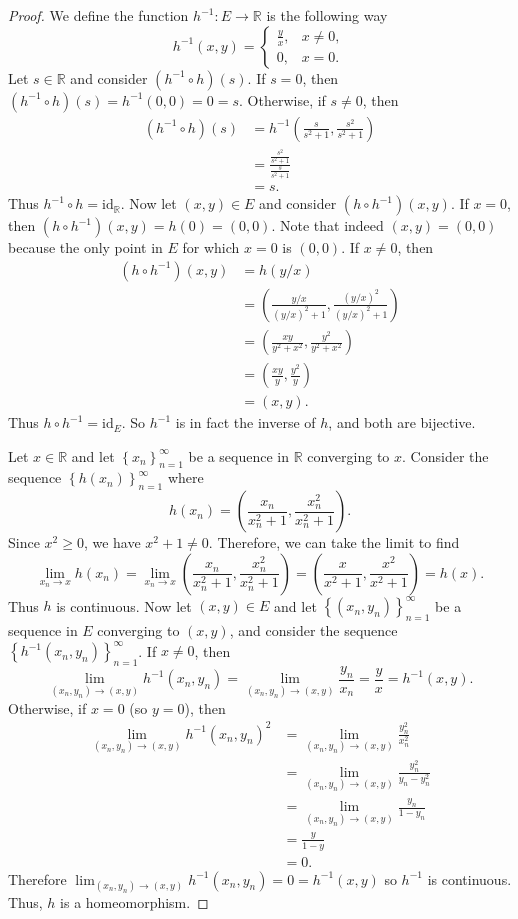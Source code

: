 \documentclass[12pt]{article}
\newcommand{\R}{\mathbb{R}}
\newcommand{\id}{\text{id}}
\newcommand{\ds}{\displaystyle}
\newcommand{\seq}[1]{\left\{#1\right\}_{n=1}^\infty}
\begin{document}
\begin{proof}
    We define the function $h^{-1}:E\to\R$ is the following way
    \[h^{-1}(x,y) = \begin{cases}\frac yx, &x\ne0, \\ 0, & x=0. \end{cases}\]
    Let $s\in\R$ and consider $(h^{-1}\circ h)(s)$. If $s=0$, then $(h^{-1}\circ h)(s) = h^{-1}(0,0) = 0 = s$. Otherwise, if $s\ne0$, then
    \begin{align*}
        (h^{-1}\circ h)(s)
            &= h^{-1}\left(\frac{s}{s^2+1}, \frac{s^2}{s^2+1}\right) \\
            &= \frac{\frac{s^2}{s^2+1}}{\frac{s}{s^2+1}} \\
            &= s.
    \end{align*}
    Thus $h^{-1}\circ h = \id_\R$. Now let $(x,y)\in E$ and consider $(h\circ h^{-1})(x,y)$. If $x=0$, then $(h\circ h^{-1})(x,y) = h(0) = (0,0)$. Note that indeed $(x,y)=(0,0)$ because the only point in $E$ for which $x=0$ is $(0,0)$. If $x\ne0$, then
    \begin{align*}
        (h\circ h^{-1})(x,y)
            &= h(y/x) \\
            &= \left(\frac{y/x}{(y/x)^2+1}, \frac{(y/x)^2}{(y/x)^2+1}\right) \\
            &= \left(\frac{xy}{y^2+x^2}, \frac{y^2}{y^2+x^2}\right) \\
            &= \left(\frac{xy}{y}, \frac{y^2}{y}\right) \\
            &= (x,y).
    \end{align*}
    Thus $h\circ h^{-1} = \id_E$. So $h^{-1}$ is in fact the inverse of $h$, and both are bijective.
    
    Let $x\in\R$ and let $\seq{x_n}$ be a sequence in $\R$ converging to $x$. Consider the sequence $\seq{h(x_n)}$ where
    \[h(x_n) = \left(\frac{x_n}{x_n^2+1}, \frac{x_n^2}{x_n^2+1}\right).\]
    Since $x^2\geq0$, we have $x^2+1\ne0$. Therefore, we can take the limit to find
    \[\lim_{x_n\to x}h(x_n) = \lim_{x_n\to x}\left(\frac{x_n}{x_n^2+1}, \frac{x_n^2}{x_n^2+1}\right) = \left(\frac{x}{x^2+1}, \frac{x^2}{x^2+1}\right) = h(x).\]
    Thus $h$ is continuous. Now let $(x,y)\in E$ and let $\seq{(x_n,y_n)}$ be a sequence in $E$ converging to $(x,y)$, and consider the sequence $\seq{h^{-1}(x_n,y_n)}$. If $x\ne0$, then
    \[\lim_{(x_n,y_n)\to(x,y)}h^{-1}(x_n,y_n) = \lim_{(x_n,y_n)\to(x,y)}\frac{y_n}{x_n} = \frac yx = h^{-1}(x,y).\]
    Otherwise, if $x=0$ (so $y=0$), then
    \begin{align*}
        \lim_{(x_n,y_n)\to(x,y)}h^{-1}(x_n,y_n)^2 
            &= \lim_{(x_n,y_n)\to(x,y)}\frac{y_n^2}{x_n^2} \\
            &= \lim_{(x_n,y_n)\to(x,y)}\frac{y_n^2}{y_n-y_n^2} \\
            &= \lim_{(x_n,y_n)\to(x,y)}\frac{y_n}{1-y_n} \\
            &= \frac{y}{1-y} \\
            &= 0.
    \end{align*}
    Therefore $\ds\lim_{(x_n,y_n)\to(x,y)}h^{-1}(x_n,y_n) = 0 = h^{-1}(x,y)$ so $h^{-1}$ is continuous. Thus, $h$ is a homeomorphism.
     

\end{proof}
\end{document}
